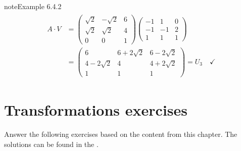 \documentclass[letterpaper,10pt,english]{jupyterBook}
\begin{document}
\begin{sphinxadmonition}{note}{Example 6.4.2}
\begin{equation*}
\begin{split}
\begin{align*}
    A \cdot V &= \begin{pmatrix}
        \sqrt{2} & -\sqrt{2} & 6 \\
        \sqrt{2} & \sqrt{2} & 4 \\
        0 & 0 & 1
    \end{pmatrix}
    \begin{pmatrix}
        -1 & 1 & 0 \\
        -1 & -1 & 2 \\
        1 & 1 & 1
    \end{pmatrix} \\
    &= \begin{pmatrix}
        6 & 6 + 2\sqrt{2} & 6 - 2\sqrt{2} \\
        4 - 2\sqrt{2} & 4 & 4 + 2\sqrt{2} \\
        1 & 1 & 1
    \end{pmatrix} = U_3 \quad \checkmark
\end{align*} \end{split}
\end{equation*}\end{sphinxadmonition}

\sphinxstepscope


\section{Transformations exercises}
\label{\detokenize{_pages/6.5_Linear_transforation_exercises:transformations-exercises}}\label{\detokenize{_pages/6.5_Linear_transforation_exercises:transformations-exercises-section}}\label{\detokenize{_pages/6.5_Linear_transforation_exercises::doc}}
\sphinxAtStartPar
Answer the following exercises based on the content from this chapter. The solutions can be found in the {\hyperref[\detokenize{_pages/A5_Vector_spaces_exercises_solutions:vector-spaces-exercises-solutions-section}]{}}.
 \label{exercise:transformations-ex-linear-transformations}
\end{document}
